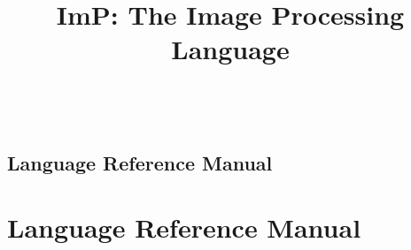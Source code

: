 \documentclass[10pt,letterpaper,titlepage,onecolumn,oneside]{book}
\newcommand{\sys}{ImP}
\newcommand{\longtitle}{\sys{}: The Image Processing Language}
\begin{document}

\title{\longtitle{}}
\author{\authorlist{}\\\authoremails{}}
\maketitle

\ifproposal
  
\else
  \ifrefman
    \section{Language Reference Manual}
    
  \else
    \tableofcontents
    
    
    \chapter{Language Reference Manual}
    
    
    
    
    
    \appendix
    
    {
      \balance
      
      
    }
  \fi
\fi
\end{document}
